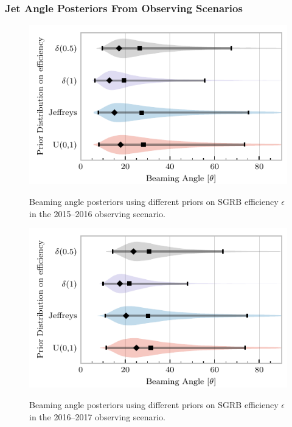 \documentclass[twocolumn,nofootinbib]{revtex4-1}
\begin{document}
\subsubsection{Jet Angle Posteriors From Observing Scenarios}

\begin{figure}
\centering
{\includegraphics[width=\linewidth]{O1_beaming_posteriors_violin.pdf}}
\caption{Beaming angle posteriors using different priors on \ac{SGRB} efficiency $\epsilon$ in the 2015--2016 observing scenario.
    \label{fig:jetposterior2016}}
\end{figure}

\begin{figure}
\centering
{\includegraphics[width=\linewidth]{O2_beaming_posteriors_violin.pdf}}
\caption{Beaming angle posteriors using different priors on \ac{SGRB} efficiency $\epsilon$ in the 2016--2017 observing scenario.
    \label{fig:jetposterior2022}}
\end{figure}
\end{document}
